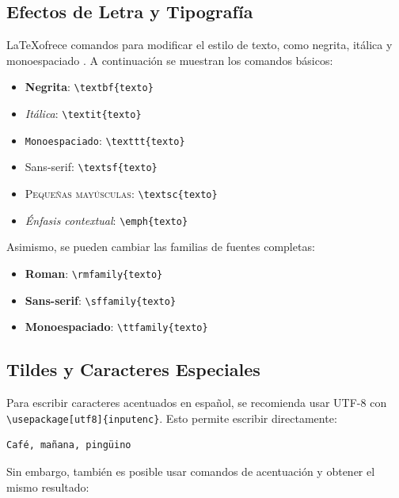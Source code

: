 \subsection{Efectos de Letra y Tipografía}

\LaTeX ofrece comandos para modificar el estilo de texto, como negrita, itálica y monoespaciado \cite{latex_fontguide}. A continuación se muestran los comandos básicos:

\begin{itemize}
    \item \textbf{Negrita}: \texttt{\textbackslash textbf\{texto\}}
    \item \textit{Itálica}: \texttt{\textbackslash textit\{texto\}}
    \item \texttt{Monoespaciado}: \texttt{\textbackslash texttt\{texto\}}
    \item \textsf{Sans-serif}: \texttt{\textbackslash textsf\{texto\}}
    \item \textsc{Pequeñas mayúsculas}: \texttt{\textbackslash textsc\{texto\}}
    \item \emph{Énfasis contextual}: \texttt{\textbackslash emph\{texto\}}
\end{itemize}

Asimismo, se pueden cambiar las familias de fuentes completas:

\begin{itemize}
    \item \textbf{Roman}: \texttt{\textbackslash rmfamily\{texto\}}
    \item \textbf{Sans-serif}: \texttt{\textbackslash sffamily\{texto\}}
    \item \textbf{Monoespaciado}: \texttt{\textbackslash ttfamily\{texto\}}
\end{itemize}

\subsection{Tildes y Caracteres Especiales}

Para escribir caracteres acentuados en español, se recomienda usar UTF-8 con \texttt{\textbackslash usepackage[utf8]\{inputenc\}}. Esto permite escribir directamente:

\begin{verbatim}
Café, mañana, pingüino
\end{verbatim}

Sin embargo, también es posible usar comandos de acentuación y obtener el mismo resultado:

